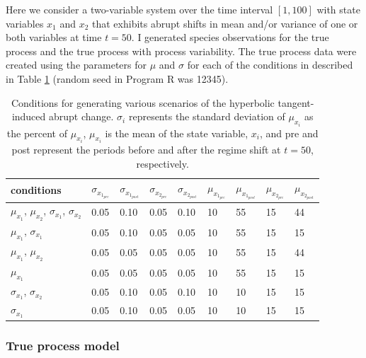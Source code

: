 \documentclass[print]{nuthesis}
\begin{document}
Here we consider a two-variable system over the time interval \([1,100]\) with state variables \(x_1\) and \(x_2\) that exhibits abrupt shifts in mean and/or variance of one or both variables at time \(t=50\). I generated species observations for the true process and the true process with process variability. The true process data were created using the parameters for \(\mu\) and \(\sigma\) for each of the conditions in described in Table \ref{tab:sysParams} (random seed in Program R was 12345).
\begin{table}[t]

\caption{\label{tab:sysParams}Conditions for generating various scenarios of the hyperbolic tangent-induced abrupt change. $\sigma_i$ represents the standard deviation of $\mu_{x_i}$ as the percent of $\mu_{x_i}$, $\mu_{x_i}$ is the mean of the state variable, $x_i$, and pre and post represent the periods before and after the regime shift at $t=50$, respectively.}
\centering
\begin{tabular}{lllllllll}
\toprule
conditions & $\sigma_{x_{1_{pre}}}$ & $\sigma_{x_{1_{post}}}$ & $\sigma_{x_{2_{pre}}}$ & $\sigma_{x_{2_{post}}}$ & $\mu_{x_{1_{pre}}}$ & $\mu_{x_{1_{post}}}$ & $\mu_{x_{2_{pre}}}$ & $\mu_{x_{2_{post}}}$\\
\midrule
$\mu_{x_1}$, $\mu_{x_2}$, $\sigma_{x_1}$, $\sigma_{x_2}$ & 0.05 & 0.10 & 0.05 & 0.10 & 10 & 55 & 15 & 44\\
$\mu_{x_1}$, $\sigma_{x_1}$ & 0.05 & 0.10 & 0.05 & 0.05 & 10 & 55 & 15 & 15\\
$\mu_{x_1}$, $\mu_{x_2}$ & 0.05 & 0.05 & 0.05 & 0.05 & 10 & 55 & 15 & 44\\
$\mu_{x_1}$ & 0.05 & 0.05 & 0.05 & 0.05 & 10 & 55 & 15 & 15\\
$\sigma_{x_1}$, $\sigma_{x_2}$ & 0.05 & 0.10 & 0.05 & 0.10 & 10 & 10 & 15 & 15\\
\addlinespace
$\sigma_{x_1}$ & 0.05 & 0.10 & 0.05 & 0.05 & 10 & 10 & 15 & 15\\
\bottomrule
\end{tabular}
\end{table}
\hypertarget{true-process-model}{%
\subsubsection{True process model}\label{true-process-model}}
\end{document}
